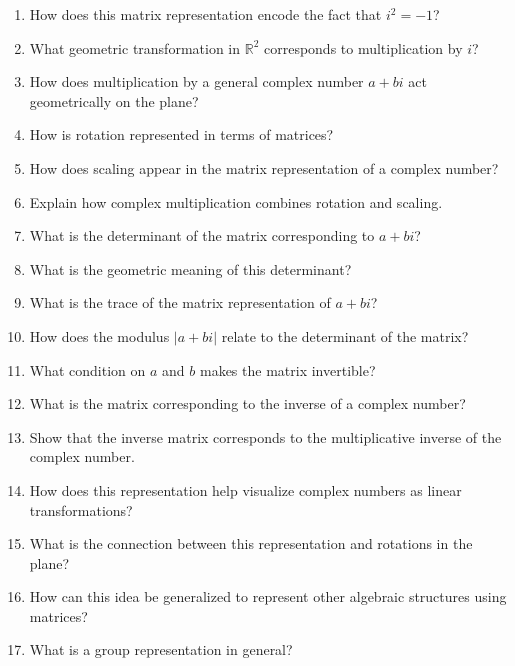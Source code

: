 \begin{enumerate}
\item How does this matrix representation encode the fact that $i^2 = -1$?

\item What geometric transformation in $\mathbb{R}^2$ corresponds to multiplication by $i$?

\item How does multiplication by a general complex number $a + bi$ act geometrically on the plane?

\item How is rotation represented in terms of matrices?

\item How does scaling appear in the matrix representation of a complex number?

\item Explain how complex multiplication combines rotation and scaling.

\item What is the determinant of the matrix corresponding to $a + bi$?

\item What is the geometric meaning of this determinant?

\item What is the trace of the matrix representation of $a + bi$?

\item How does the modulus $|a+bi|$ relate to the determinant of the matrix?

\item What condition on $a$ and $b$ makes the matrix invertible?

\item What is the matrix corresponding to the inverse of a complex number?

\item Show that the inverse matrix corresponds to the multiplicative inverse of the complex number.

\item How does this representation help visualize complex numbers as linear transformations?

\item What is the connection between this representation and rotations in the plane?

\item How can this idea be generalized to represent other algebraic structures using matrices?

\item What is a group representation in general?


\end{enumerate}
